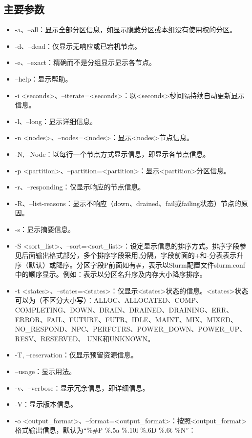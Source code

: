 \subsection{主要参数}
\begin{itemize}
	\item -a、--all：显示全部分区信息，如显示隐藏分区或本组没有使用权的分区。
	\item -d、--dead：仅显示无响应或已宕机节点。
	\item -e、--exact：精确而不是分组显示显示各节点。
	\item --help：显示帮助。
	\item -i <seconds>、--iterate=<seconds>：以<seconds>秒间隔持续自动更新显示信息。
	\item -l、--long：显示详细信息。
	\item -n <nodes>、--nodes=<nodes>：显示<nodes>节点信息。
	\item -N, --Node：以每行一个节点方式显示信息，即显示各节点信息。
	\item -p <partition>、--partition=<partition>：显示<partition>分区信息。
	\item -r、--responding：仅显示响应的节点信息。
	\item -R、--list-reasons：显示不响应（down、drained、fail或failing状态）节点的原因。
	\item -s：显示摘要信息。
	\item -S <sort\_list>、--sort=<sort\_list>：设定显示信息的排序方式。排序字段参见后面输出格式部分，多个排序字段采用,分隔，字段前面的+和-分表表示升序（默认）或降序。分区字段P前面如有\#，表示以Slurm配置文件slurm.conf中的顺序显示。例如：表示以分区名升序及内存大小降序排序。
	\item -t <states>、--states=<states>：仅显示<states>状态的信息。<states>状态可以为（不区分大小写）：ALLOC、ALLOCATED、COMP、COMPLETING、DOWN、DRAIN、DRAINED、DRAINING、ERR、ERROR、FAIL、FUTURE、FUTR、IDLE、MAINT、MIX、MIXED、NO\_RESPOND、NPC、PERFCTRS、POWER\_DOWN、POWER\_UP、RESV、RESERVED、 UNK和UNKNOWN。
	\item -T, --reservation：仅显示预留资源信息。
	\item --usage：显示用法。
	\item -v、--verbose：显示冗余信息，即详细信息。
	\item -V：显示版本信息。
	\item -o <output\_format>、--format=<output\_format>：按照<output\_format>格式输出信息，默认为``\%\#P \%.5a \%.10l \%.6D \%.6t \%N''：
\begin{itemize}

\end{itemize}
\end{itemize}
